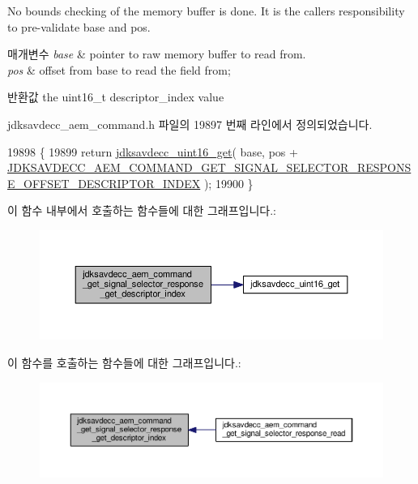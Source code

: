 No bounds checking of the memory buffer is done. It is the caller\textquotesingle{}s responsibility to pre-\/validate base and pos.


\begin{DoxyParams}{매개변수}
{\em base} & pointer to raw memory buffer to read from. \\
\hline
{\em pos} & offset from base to read the field from; \\
\hline
\end{DoxyParams}
\begin{DoxyReturn}{반환값}
the uint16\+\_\+t descriptor\+\_\+index value 
\end{DoxyReturn}


jdksavdecc\+\_\+aem\+\_\+command.\+h 파일의 19897 번째 라인에서 정의되었습니다.


\begin{DoxyCode}
19898 \{
19899     \textcolor{keywordflow}{return} \hyperlink{group__endian_ga3fbbbc20be954aa61e039872965b0dc9}{jdksavdecc\_uint16\_get}( base, pos + 
      \hyperlink{group__command__get__signal__selector__response_gadaaeaae9a94dd20e84a10b7c0acc70cc}{JDKSAVDECC\_AEM\_COMMAND\_GET\_SIGNAL\_SELECTOR\_RESPONSE\_OFFSET\_DESCRIPTOR\_INDEX}
       );
19900 \}
\end{DoxyCode}


이 함수 내부에서 호출하는 함수들에 대한 그래프입니다.\+:
\nopagebreak
\begin{figure}[H]
\begin{center}
\leavevmode
\includegraphics[width=350pt]{group__command__get__signal__selector__response_gaeda1f10c684fb4899ed11ea05b93626c_cgraph}
\end{center}
\end{figure}




이 함수를 호출하는 함수들에 대한 그래프입니다.\+:
\nopagebreak
\begin{figure}[H]
\begin{center}
\leavevmode
\includegraphics[width=350pt]{group__command__get__signal__selector__response_gaeda1f10c684fb4899ed11ea05b93626c_icgraph}
\end{center}
\end{figure}


